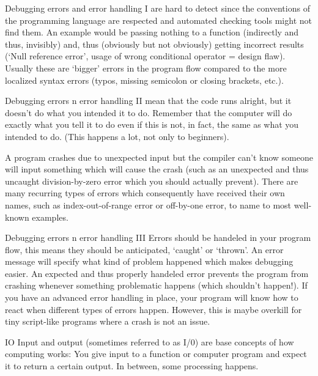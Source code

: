 \documentclass[10pt,a4paper]{article}
\begin{document}
\begin{multicols}{3}
\begin{textbox}{Debugging errors and error handling I}
 are hard to detect since the conventions of the programming language are respected and automated checking tools might not find them. An example would be passing nothing to a function (indirectly and thus, invisibly) and, thus (obviously but not obviously) getting incorrect results (`Null reference error', usage of wrong conditional operator = design flaw). Usually these are `bigger' errors in the program flow compared to the more localized syntax errors (typos, missing semicolon or closing brackets, etc.).
\end{textbox}

\begin{textbox}{Debugging errors n error handling II}
 mean that the code runs alright, but it doesn't do what you intended it to do. Remember that the computer will do exactly what you tell it to do even if this is not, in fact, the same as what you intended to do. (This happens a lot, not only to beginners).

 A program crashes due to unexpected input but the compiler can't know someone will input something which will cause the crash (such as an unexpected and thus uncaught division-by-zero error which you should actually prevent). There are many recurring types of errors which consequently have received their own names, such as index-out-of-range error or off-by-one error, to name to most well-known examples.
\end{textbox}

\begin{textbox}{Debugging errors n error handling III}
 Errors should be handeled in your program flow, this means they should be anticipated, `caught' or `thrown'. An error message will specify what kind of problem happened which makes debugging easier. An expected and thus properly handeled error prevents the program from crashing whenever something problematic happens (which shouldn't happen!). If you have an advanced error handling in place, your program will know how to react when different types of errors happen. However, this is maybe overkill for tiny script-like programs where a crash is not an issue. 
\end{textbox}

\begin{textbox}{IO}
 Input and output (sometimes referred to as I/0) are base concepts of how computing works: You give input to a function or computer program and expect it to return a certain output. In between, some processing happens.


\end{textbox}
\end{multicols}
\end{document}
